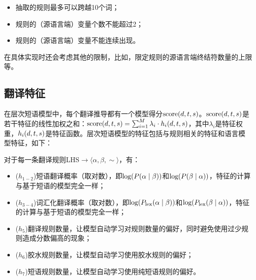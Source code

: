 \begin{itemize}
\vspace{0.5em}
\item 抽取的规则最多可以跨越10个词；
\vspace{0.5em}
\item 规则的（源语言端）变量个数不能超过2；
\vspace{0.5em}
\item 规则的（源语言端）变量不能连续出现。
\vspace{0.5em}
\end{itemize}
\parinterval 在具体实现时还会考虑其他的限制，比如，限定规则的源语言端终结符数量的上限等。


\subsection{翻译特征}

\parinterval 在层次短语模型中，每个翻译推导都有一个模型得分$\textrm{score}(d,{t},{s})$。$\textrm{score}(d,{t},{s})$是若干特征的线性加权之和：$\textrm{score}(d,{t},{s})=\sum_{i=1}^M\lambda_i\cdot h_i (d,{t},{s})$，其中$\lambda_i$是特征权重，$h_i (d,{t},{s})$是特征函数。层次短语模型的特征包括与规则相关的特征和语言模型特征，如下：

\parinterval 对于每一条翻译规则LHS$\to \langle \alpha, \beta ,\sim \rangle$，有：

\begin{itemize}
\vspace{0.5em}
\item 	($h_{1-2}$)短语翻译概率（取对数），即$\textrm{log}({P}(\alpha \mid \beta))$和$\textrm{log}({P}(\beta \mid \alpha))$，特征的计算与基于短语的模型完全一样；
\vspace{0.5em}
\item 	($h_{3-4}$)词汇化翻译概率（取对数），即$\textrm{log}({P}_{\textrm{lex}}(\alpha \mid \beta))$和$\textrm{log}({P}_{\textrm{lex}}(\beta \mid \alpha))$，特征的计算与基于短语的模型完全一样；
\vspace{0.5em}
\item ($h_{5}$)翻译规则数量，让模型自动学习对规则数量的偏好，同时避免使用过少规则造成分数偏高的现象；
\vspace{0.5em}
\item ($h_{6}$)胶水规则数量，让模型自动学习使用胶水规则的偏好；
\vspace{0.5em}
\item ($h_{7}$)短语规则数量，让模型自动学习使用纯短语规则的偏好。
\vspace{0.5em}
\end{itemize}

